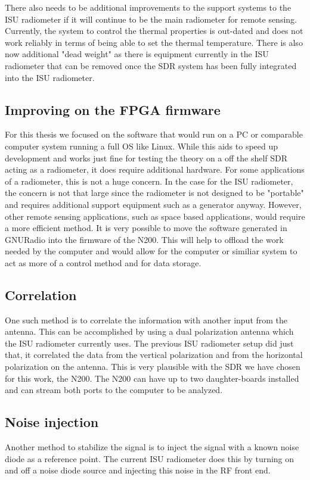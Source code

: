There also needs to be additional improvements to the support systems to the ISU radiometer if it will continue to be the main radiometer for remote sensing.  Currently, the system to control the thermal properties is out-dated and does not work reliably in terms of being able to set the thermal temperature.  There is also now additional "dead weight" as there is equipment currently in the ISU radiometer that can be removed once the SDR system has been fully integrated into the ISU radiometer. 

\subsection{Improving on the FPGA firmware}

For this thesis we focused on the software that would run on a PC or comparable computer system running a full OS like Linux.  While this aids to speed up development and works just fine for testing the theory on a off the shelf SDR acting as a radiometer, it does require additional hardware.  For some applications of a radiometer, this is not a huge concern.  In the case for the ISU radiometer, the concern is not that large since the radiometer is not designed to be "portable" and requires additional support equipment such as a generator anyway.  However, other remote sensing applications, such as space based applications, would require a more efficient method.  It is very possible to move the software generated in GNURadio into the firmware of the N200.  This will help to offload the work needed by the computer and would allow for the computer or similiar system to act as more of a control method and for data storage.  

\subsection{Correlation}  
One such method is to correlate the information with another input from the antenna.  This can be accomplished by using a dual polarization antenna which the ISU radiometer currently uses.  The previous ISU radiometer setup did just that, it correlated the data from the vertical polarization and from the horizontal polarization on the antenna.  This is very plausible with the SDR we have chosen for this work, the N200.  The N200 can have up to two daughter-boards installed and can stream both ports to the computer to be analyzed.  

\subsection{Noise injection}
Another method to stabilize the signal is to inject the signal with a known noise diode as a reference point.  The current ISU radiometer does this by turning on and off a noise diode source and injecting this noise in the RF front end.  

